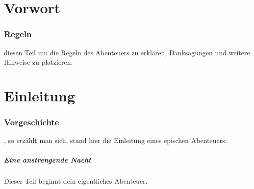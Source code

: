 
\chapter*{Vorwort}

\subsection{Regeln}

 diesen Teil um die Regeln des Abenteuers zu erklären, Danksagungen und weitere Hinweise zu platzieren.
\chapter*{Einleitung}

\subsection{Vorgeschichte}

, so erzählt man sich, stand hier die Einleitung eines epischen Abenteuers.

\paragraph{Eine anstrengende Nacht}

Dieser Teil beginnt dein eigentliches Abenteuer.
